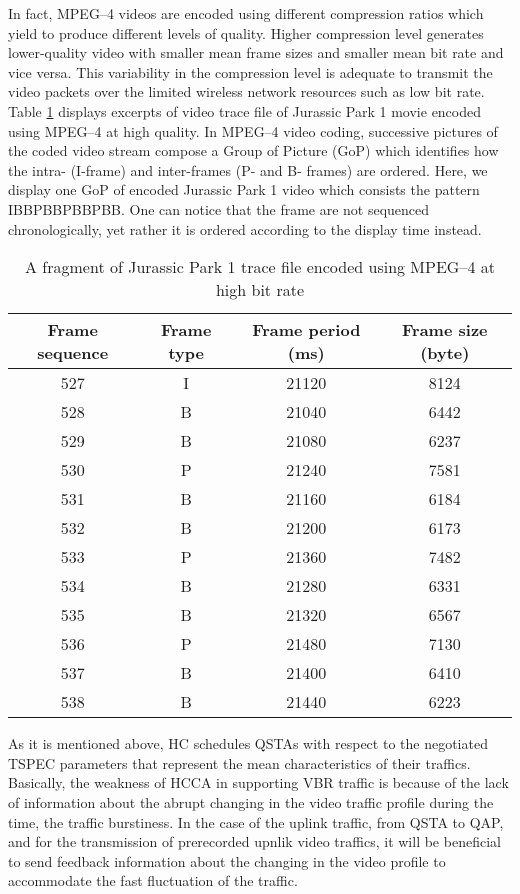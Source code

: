 \documentclass[a4paper, conference]{IEEEtran}
\begin{document}
In fact, MPEG--4 videos are encoded using different compression ratios which yield to produce different levels of quality. Higher compression level generates lower-quality video with smaller mean frame sizes and smaller mean bit rate and vice versa. This variability in the compression level is adequate to transmit the video packets over the limited wireless network resources such as low bit rate. Table \ref{tab:traceFragHigh} displays excerpts of video trace file of Jurassic Park 1 movie \cite{Fitzek2000} encoded using MPEG--4 at high quality.
In MPEG--4 video coding, successive pictures of the coded video stream compose a Group of Picture (GoP) which identifies how the intra- (I-frame) and inter-frames (P- and B- frames) are ordered.
Here, we display one GoP of encoded Jurassic Park 1 video which consists the pattern IBBPBBPBBPBB. One can notice that the frame are not sequenced chronologically, yet rather it is ordered according to the display time instead.
\begin{table}
\centering
\caption {A fragment of Jurassic Park 1 trace file encoded using MPEG--4 at high bit rate}
\begin{tabular}{cccc}
\hline
Frame sequence & Frame type & Frame period (ms) & Frame size (byte)
\\ \hline
527 & I & 21120 & 8124 \\
528 & B & 21040 & 6442 \\
529 & B & 21080 & 6237 \\
530 & P & 21240 & 7581 \\
531 & B & 21160 & 6184 \\
532 & B & 21200 & 6173 \\
533 & P & 21360 & 7482 \\
534 & B & 21280 & 6331 \\
535 & B & 21320 & 6567 \\
536 & P & 21480 & 7130 \\
537 & B & 21400 & 6410 \\
538 & B & 21440 & 6223 \\ \hline
\end{tabular}
\label{tab:traceFragHigh}
\end{table}
As it is mentioned above, HC schedules QSTAs with respect to the negotiated TSPEC parameters that represent the mean characteristics of their traffics. Basically, the weakness of HCCA in supporting VBR traffic is because of the lack of information about the abrupt changing in the video traffic profile during the time, the traffic burstiness. In the case of the uplink traffic, from QSTA to QAP, and for the transmission of prerecorded upnlik video traffics, it will be beneficial to send feedback information about the changing in the video profile to accommodate the fast fluctuation of the traffic.
\end{document}

